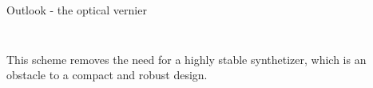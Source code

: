 \begin{block}{Outlook - the optical vernier}
\begin{columns}
\begin{column}{0.60\textwidth}
\begin{itemize}
\begin{itemize}
       \end{itemize}
     \end{itemize}
    \end{column}
    \begin{column}{0.39\textwidth}
      \begin{figure}
        \begin{center}
          \setlength\fboxsep{0pt}
          \setlength\fboxrule{0.5pt}
        \end{center}
      \end{figure}
    \end{column}
  \end{columns}
  This scheme removes the need for a highly stable synthetizer, which is an obstacle to a compact and robust design.
\end{block}
